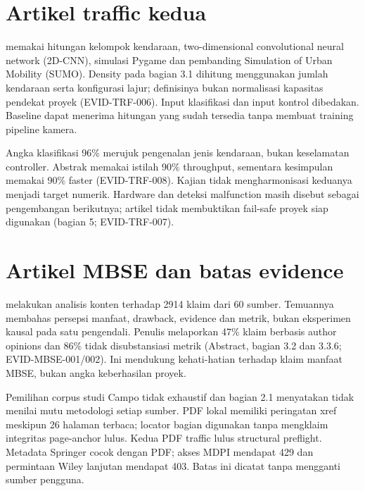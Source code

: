 \section{Artikel traffic kedua}
\textcite{mathiane2023} memakai hitungan kelompok kendaraan, two-dimensional convolutional neural network (2D-CNN), simulasi Pygame dan pembanding Simulation of Urban Mobility (SUMO). Density pada bagian 3.1 dihitung menggunakan jumlah kendaraan serta konfigurasi lajur; definisinya bukan normalisasi kapasitas pendekat proyek (EVID-TRF-006). Input klasifikasi dan input kontrol dibedakan. Baseline dapat menerima hitungan yang sudah tersedia tanpa membuat training pipeline kamera.

Angka klasifikasi 96\% merujuk pengenalan jenis kendaraan, bukan keselamatan controller. Abstrak memakai istilah 90\% throughput, sementara kesimpulan memakai 90\% faster (EVID-TRF-008). Kajian tidak mengharmonisasi keduanya menjadi target numerik. Hardware dan deteksi malfunction masih disebut sebagai pengembangan berikutnya; artikel tidak membuktikan fail-safe proyek siap digunakan (bagian 5; EVID-TRF-007).

\section{Artikel MBSE dan batas evidence}
\textcite{campo2023} melakukan analisis konten terhadap 2914 klaim dari 60 sumber. Temuannya membahas persepsi manfaat, drawback, evidence dan metrik, bukan eksperimen kausal pada satu pengendali. Penulis melaporkan 47\% klaim berbasis author opinions dan 86\% tidak disubstansiasi metrik (Abstract, bagian 3.2 dan 3.3.6; EVID-MBSE-001/002). Ini mendukung kehati-hatian terhadap klaim manfaat MBSE, bukan angka keberhasilan proyek.

Pemilihan corpus studi Campo tidak exhaustif dan bagian 2.1 menyatakan tidak menilai mutu metodologi setiap sumber. PDF lokal memiliki peringatan xref meskipun 26 halaman terbaca; locator bagian digunakan tanpa mengklaim integritas page-anchor lulus. Kedua PDF traffic lulus structural preflight. Metadata Springer cocok dengan PDF; akses MDPI mendapat 429 dan permintaan Wiley lanjutan mendapat 403. Batas ini dicatat tanpa mengganti sumber pengguna.

